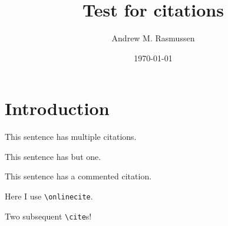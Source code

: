 \documentclass[aip,jcp,amsmath,amssymb,reprint,floatfix]{revtex4-1}
\begin{document}
\title{Test for citations}
\author{Andrew M. Rasmussen}
\date{\today}

\maketitle

\section{Introduction}\label{introduction}

This sentence has multiple citations.\cite{Skolnick2004,Wood2010}

This sentence has but one.\cite{Kos2005}

This sentence has a commented citation.%

Here I use  \verb|\onlinecite|.

Two subsequent \verb|\cite|s!\cite{Holland2013}\cite{Tang2010b}


\end{document}
